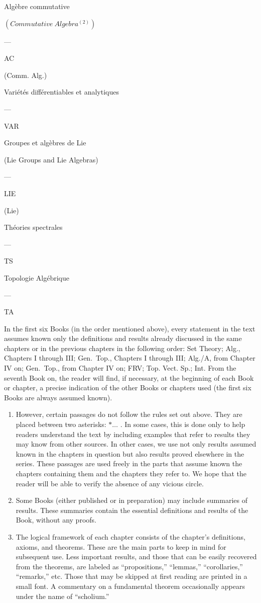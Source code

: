 Algèbre commutative

\((Commutative\ Algebra^{(2)})\)

---

AC

(Comm. Alg.)

Variétés différentiables et analytiques

---

VAR

Groupes et algèbres de Lie

(Lie Groups and Lie Algebras)

---

LIE

(Lie)

Théories spectrales

---

TS

Topologie Algébrique

---

TA

In the first six Books (in the order mentioned above), every statement in the text assumes known only the definitions and results already discussed in the same chapters or in the previous chapters in the following order: Set Theory; Alg., Chapters I through III; Gen.~Top., Chapters I through III; Alg./A, from Chapter IV on; Gen.~Top., from Chapter IV on; FRV; Top. Vect. Sp.; Int. From the seventh Book on, the reader will find, if necessary, at the beginning of each Book or chapter, a precise indication of the other Books or chapters used (the first six Books are always assumed known).

\begin{enumerate}
\def\labelenumi{\arabic{enumi}.}
\setcounter{enumi}{3}
\item
  However, certain passages do not follow the rules set out above. They are placed between two asterisks: \(*\ldots\) . In some cases, this is done only to help readers understand the text by including examples that refer to results they may know from other sources. In other cases, we use not only results assumed known in the chapters in question but also results proved elsewhere in the series. These passages are used freely in the parts that assume known the chapters containing them and the chapters they refer to. We hope that the reader will be able to verify the absence of any vicious circle.
\item
  Some Books (either published or in preparation) may include summaries of results. These summaries contain the essential definitions and results of the Book, without any proofs.
\item
  The logical framework of each chapter consists of the chapter's definitions, axioms, and theorems. These are the main parts to keep in mind for subsequent use. Less important results, and those that can be easily recovered from the theorems, are labeled as ``propositions,'' ``lemmas,'' ``corollaries,'' ``remarks,'' etc. Those that may be skipped at first reading are printed in a small font. A commentary on a fundamental theorem occasionally appears under the name of ``scholium.''
\end{enumerate}

